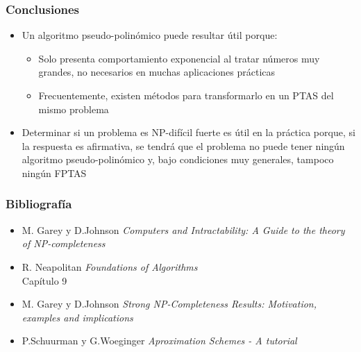 \documentclass{beamer}
\begin{document}
\begin{frame}
	\frametitle{Conclusiones}
	\begin{itemize}
		\item Un algoritmo pseudo-polinómico puede resultar útil porque:
		\begin{itemize}
			\item Solo presenta comportamiento exponencial al tratar números muy grandes, no necesarios en muchas aplicaciones prácticas
			\item Frecuentemente, existen métodos para transformarlo en un PTAS del mismo problema
		\end{itemize}
	    \item Determinar si un problema es NP-difícil fuerte es útil en la práctica porque, si la respuesta es afirmativa, se tendrá que el problema no puede tener ningún algoritmo pseudo-polinómico y, bajo condiciones muy generales, tampoco ningún FPTAS
	 \end{itemize}
\end{frame}
\begin{frame}
	\frametitle{Bibliografía}
	\begin{itemize}
		\item M. Garey y D.Johnson \textit{Computers and Intractability: A Guide to the theory of NP-completeness}
		\item R. Neapolitan \textit{Foundations of Algorithms}\\
		\alert{Capítulo 9}
		\item  M. Garey y D.Johnson \textit{Strong NP-Completeness Results: Motivation, examples and implications}
		\item P.Schuurman y G.Woeginger \textit{Aproximation Schemes - A tutorial}
	\end{itemize}
\end{frame}
\end{document}
